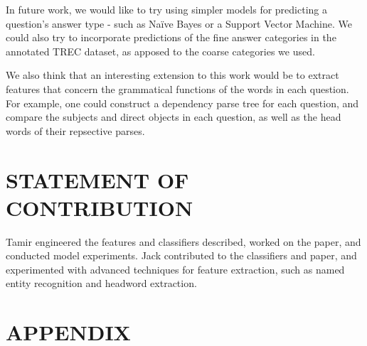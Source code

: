 \documentclass[letterpaper, 10 pt, conference]{ieeeconf}  %
\begin{document}
In future work, we would like to try using simpler models for predicting a question's answer type - such as Naïve Bayes or a Support Vector Machine. We could also try to incorporate predictions of the fine answer categories in the annotated TREC dataset, as apposed to the coarse categories we used. 

We also think that an interesting extension to this work would be to extract features that concern the grammatical functions of the words in each question. For example, one could construct a dependency parse tree for each question, and compare the subjects and  direct objects in each question, as well as the head words of their repsective parses.

\addtolength{\textheight}{-12cm}   %









\section{STATEMENT OF CONTRIBUTION}

Tamir engineered the features and classifiers described, worked on the paper, and conducted model experiments. Jack contributed to the classifiers and paper, and experimented with advanced techniques for feature extraction, such as named entity recognition and headword extraction. 

\section*{APPENDIX}
\end{document}
